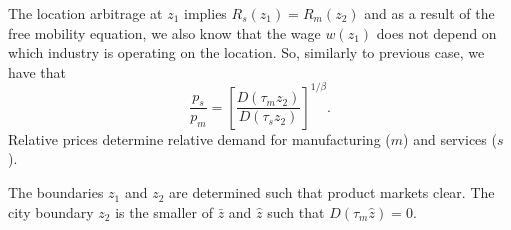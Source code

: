 \documentclass[10pt]{article}
\begin{document}
\begin{enumerate}
The location arbitrage at $z_1$ implies $R_s(z_1)=R_m(z_2)$ and as a result of the free mobility equation, we also know that the wage $w(z_1)$ does not depend on which industry is operating on the location. So, similarly to previous case, we have that
\begin{equation}
\frac{p_s}{p_m}=\left[\frac{D(\tau_mz_2)}{D(\tau_sz_2)}\right]^{1/\beta}.
\end{equation}
Relative prices determine relative demand for manufacturing ($m$) and services ($s$).
 
The boundaries $z_1$ and $z_2$ are determined such that product markets clear. The city boundary $z_2$ is the smaller of $\bar{z}$ and $\hat{z}$ such that $D(\tau_m\hat{z})=0$. 
\end{enumerate}
\end{document}
